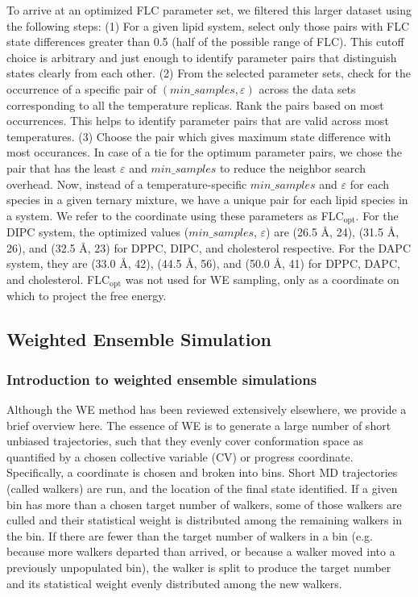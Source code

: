 \documentclass{biophys-new}
\begin{document}
To arrive at an optimized FLC parameter set, we filtered this larger dataset using the following steps:
(1) For a given lipid system, select only those pairs with FLC state differences greater than 0.5 (half of the possible range of FLC).
This cutoff choice is arbitrary and just enough to identify parameter pairs that distinguish states clearly from each other.
(2) From the selected parameter sets, check for the occurrence of a specific pair of $(min\_samples, \varepsilon)$ across the data sets corresponding to all the temperature replicas.
Rank the pairs based on most occurrences. This helps to identify parameter pairs that are valid across most temperatures.
(3) Choose the pair which gives maximum state difference with most occurances. In case of a tie for the optimum parameter pairs, we chose the pair that has the least $\varepsilon$ and $min\_samples$ to reduce the neighbor search overhead.
Now, instead of a temperature-specific $min\_samples$ and $\varepsilon$ for each species in a given ternary mixture, we have a unique pair for each lipid species in a system. We refer to the coordinate using these parameters as FLC$_{\text{opt}}$. For the DIPC system, the optimized values ($min\_samples$, $\varepsilon$) are (26.5 {\AA}, 24), (31.5 {\AA}, 26), and (32.5 {\AA}, 23) for DPPC, DIPC, and cholesterol respective. For the DAPC system, they are (33.0 {\AA}, 42), (44.5 {\AA}, 56), and (50.0 {\AA}, 41) for DPPC, DAPC, and cholesterol. FLC$_{\text{opt}}$ was not used for WE sampling, only as a coordinate on which to project the free energy.

\subsection*{Weighted Ensemble Simulation}
\subsubsection*{Introduction to weighted ensemble simulations}

Although the WE method has been reviewed extensively elsewhere\cite{Zwier2015, Zuckerman2017}, we provide a brief overview here. The essence of WE is to generate a large number of short unbiased trajectories, such that they evenly cover conformation space as quantified by a chosen collective variable (CV) or progress coordinate. Specifically, a coordinate is chosen and broken into bins. Short MD trajectories (called walkers) are run, and the location of the final state identified. If a given bin has more than a chosen target number of walkers, some of those walkers are culled and their statistical weight is distributed among the remaining walkers in the bin. If there are fewer than the target number of walkers in a bin (e.g. because more walkers departed than arrived, or because a walker moved into a previously unpopulated bin), the walker is split to produce the target number and its statistical weight evenly distributed among the new  walkers.
\end{document}
